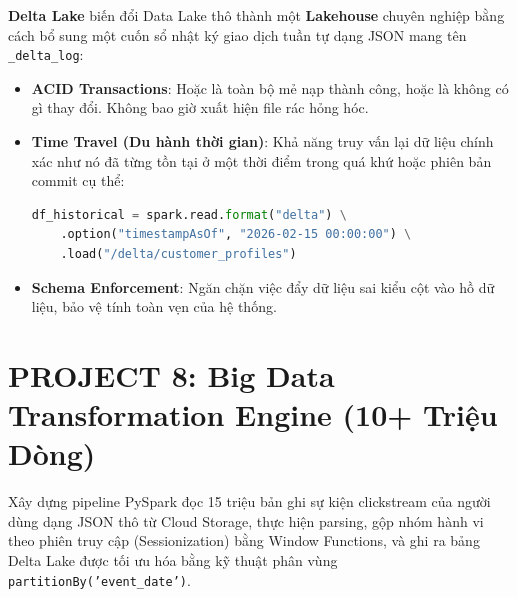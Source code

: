 \begin{lythuyetbox}
\textbf{Delta Lake} biến đổi Data Lake thô thành một \textbf{Lakehouse} chuyên nghiệp bằng cách bổ sung một cuốn sổ nhật ký giao dịch tuần tự dạng JSON mang tên \texttt{\_delta\_log}:
\begin{itemize}
    \item \textbf{ACID Transactions}: Hoặc là toàn bộ mẻ nạp thành công, hoặc là không có gì thay đổi. Không bao giờ xuất hiện file rác hỏng hóc.
    \item \textbf{Time Travel (Du hành thời gian)}: Khả năng truy vấn lại dữ liệu chính xác như nó đã từng tồn tại ở một thời điểm trong quá khứ hoặc phiên bản commit cụ thể:
    \begin{lstlisting}[language=Python]
df_historical = spark.read.format("delta") \
    .option("timestampAsOf", "2026-02-15 00:00:00") \
    .load("/delta/customer_profiles")
    \end{lstlisting}
    \item \textbf{Schema Enforcement}: Ngăn chặn việc đẩy dữ liệu sai kiểu cột vào hồ dữ liệu, bảo vệ tính toàn vẹn của hệ thống.
\end{itemize}
\end{lythuyetbox}

\section{PROJECT 8: Big Data Transformation Engine (10+ Triệu Dòng)}

Xây dựng pipeline PySpark đọc 15 triệu bản ghi sự kiện clickstream của người dùng dạng JSON thô từ Cloud Storage, thực hiện parsing, gộp nhóm hành vi theo phiên truy cập (Sessionization) bằng Window Functions, và ghi ra bảng Delta Lake được tối ưu hóa bằng kỹ thuật phân vùng \texttt{partitionBy('event\_date')}.

